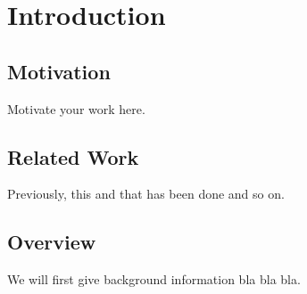 \setcounter{chapter}{0}

\chapter{Introduction}

\section{Motivation}
Motivate your work here. 


\section{Related Work}
Previously, this and that has been done and so on.


\section{Overview}
We will first give background information bla bla bla.